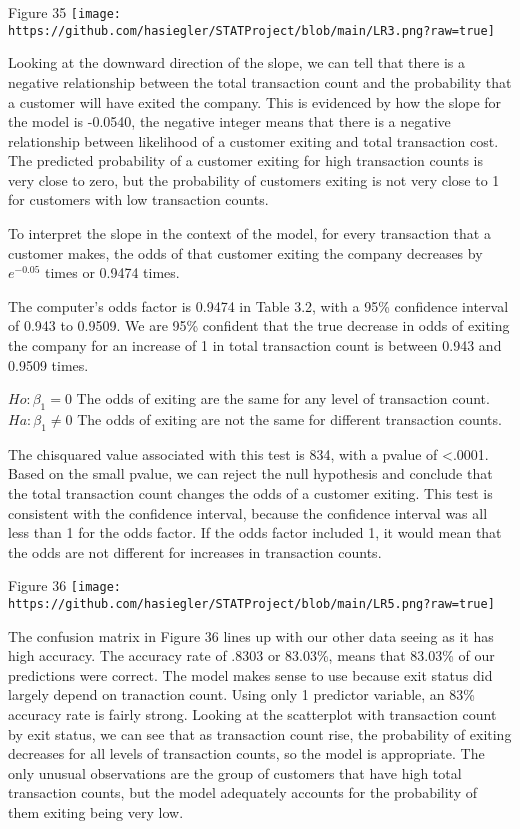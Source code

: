 \documentclass[
]{article}
\begin{document}
Figure 35
\texttt{[image: https://github.com/hasiegler/STATProject/blob/main/LR3.png?raw=true]}

Looking at the downward direction of the slope, we can tell that there
is a negative relationship between the total transaction count and the
probability that a customer will have exited the company. This is
evidenced by how the slope for the model is -0.0540, the negative
integer means that there is a negative relationship between likelihood
of a customer exiting and total transaction cost. The predicted
probability of a customer exiting for high transaction counts is very
close to zero, but the probability of customers exiting is not very
close to 1 for customers with low transaction counts.

To interpret the slope in the context of the model, for every
transaction that a customer makes, the odds of that customer exiting the
company decreases by \(e^{-0.05}\) times or 0.9474 times.

The computer's odds factor is 0.9474 in Table 3.2, with a 95\%
confidence interval of 0.943 to 0.9509. We are 95\% confident that the
true decrease in odds of exiting the company for an increase of 1 in
total transaction count is between 0.943 and 0.9509 times.

\(Ho: \beta_1 = 0\) The odds of exiting are the same for any level of
transaction count. \(Ha: \beta_1 \neq 0\) The odds of exiting are not
the same for different transaction counts.

The chisquared value associated with this test is 834, with a pvalue of
\textless.0001. Based on the small pvalue, we can reject the null
hypothesis and conclude that the total transaction count changes the
odds of a customer exiting. This test is consistent with the confidence
interval, because the confidence interval was all less than 1 for the
odds factor. If the odds factor included 1, it would mean that the odds
are not different for increases in transaction counts.

Figure 36
\texttt{[image: https://github.com/hasiegler/STATProject/blob/main/LR5.png?raw=true]}

The confusion matrix in Figure 36 lines up with our other data seeing as
it has high accuracy. The accuracy rate of .8303 or 83.03\%, means that
83.03\% of our predictions were correct. The model makes sense to use
because exit status did largely depend on tranaction count. Using only 1
predictor variable, an 83\% accuracy rate is fairly strong. Looking at
the scatterplot with transaction count by exit status, we can see that
as transaction count rise, the probability of exiting decreases for all
levels of transaction counts, so the model is appropriate. The only
unusual observations are the group of customers that have high total
transaction counts, but the model adequately accounts for the
probability of them exiting being very low.
\end{document}
